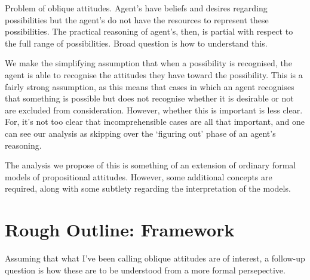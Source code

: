 \documentclass[10pt]{article}
\begin{document}
Problem of oblique attitudes.
Agent's have beliefs and desires regarding possibilities but the agent's do not have the resources to represent these possibilities.
The practical reasoning of agent's, then, is partial with respect to the full range of possibilities.
Broad question is how to understand this.

We make the simplifying assumption that when a possibility is recognised, the agent is able to recognise the attitudes they have toward the possibility.
This is a fairly strong assumption, as this means that cases in which an agent recognises that something is possible but does not recognise whether it is desirable or not are excluded from consideration.
However, whether this is important is less clear.
For, it's not too clear that incomprehensible cases are all that important, and one can see our analysis as skipping over the `figuring out' phase of an agent's reasoning.

The analysis we propose of this is something of an extension of ordinary formal models of propositional attitudes.
However, some additional concepts are required, along with some subtlety regarding the interpretation of the models.










\section{Rough Outline: Framework}
\label{sec:rough-outl-fram}

Assuming that what I've been calling oblique attitudes are of interest, a follow-up question is how these are to be understood from a more formal persepective.

\end{document}
